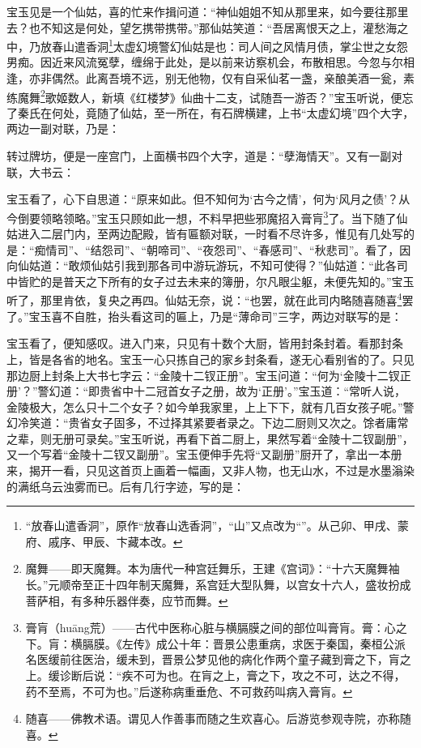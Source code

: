 \par 宝玉见是一个仙姑，喜的忙来作揖问道：“神仙姐姐不知从那里来，如今要往那里去？也不知这是何处，望乞携带携带。”那仙姑笑道：“吾居离恨天之上，灌愁海之中，乃放春山遣香洞\footnote{“放春山遣香洞”，原作“放春山选香洞”，“山”又点改为“\ShanYan”。从己卯、甲戌、蒙府、戚序、甲辰、卞藏本改。}太虚幻境警幻仙姑是也：司人间之风情月债，掌尘世之女怨男痴。因近来风流冤孽，缠绵于此处，是以前来访察机会，布散相思。今忽与尔相逢，亦非偶然。此离吾境不远，别无他物，仅有自采仙茗一盏，亲酿美酒一瓮，素练魔舞\footnote{魔舞——即天魔舞。本为唐代一种宫廷舞乐，王建《宫词》：“十六天魔舞袖长。”元顺帝至正十四年制天魔舞，系宫廷大型队舞，以宫女十六人，盛妆扮成菩萨相，有多种乐器伴奏，应节而舞。}歌姬数人，新填《红楼梦》仙曲十二支，试随吾一游否？”宝玉听说，便忘了秦氏在何处，竟随了仙姑，至一所在，有石牌横建，上书“太虚幻境”四个大字，两边一副对联，乃是：
\par 转过牌坊，便是一座宫门，上面横书四个大字，道是：“孽海情天”。又有一副对联，大书云：
\par 宝玉看了，心下自思道：“原来如此。但不知何为‘古今之情’，何为‘风月之债’？从今倒要领略领略。”宝玉只顾如此一想，不料早把些邪魔招入膏肓\footnote{膏肓（huāng荒）——古代中医称心脏与横膈膜之间的部位叫膏肓。膏：心之下。肓：横膈膜。《左传》成公十年：晋景公患重病，求医于秦国，秦桓公派名医缓前往医治，缓未到，晋景公梦见他的病化作两个童子藏到膏之下，肓之上。缓诊断后说：“疾不可为也。在肓之上，膏之下，攻之不可，达之不得，药不至焉，不可为也。”后遂称病重垂危、不可救药叫病入膏肓。}了。当下随了仙姑进入二层门内，至两边配殿，皆有匾额对联，一时看不尽许多，惟见有几处写的是：“痴情司”、“结怨司”、“朝啼司”、“夜怨司”、“春感司”、“秋悲司”。看了，因向仙姑道：“敢烦仙姑引我到那各司中游玩游玩，不知可使得？”仙姑道：“此各司中皆贮的是普天之下所有的女子过去未来的簿册，尔凡眼尘躯，未便先知的。”宝玉听了，那里肯依，复央之再四。仙姑无奈，说：“也罢，就在此司内略随喜随喜\footnote{随喜——佛教术语。谓见人作善事而随之生欢喜心。后游览参观寺院，亦称随喜。}罢了。”宝玉喜不自胜，抬头看这司的匾上，乃是“薄命司”三字，两边对联写的是：
\par 宝玉看了，便知感叹。进入门来，只见有十数个大厨，皆用封条封着。看那封条上，皆是各省的地名。宝玉一心只拣自己的家乡封条看，遂无心看别省的了。只见那边厨上封条上大书七字云：“金陵十二钗正册”。宝玉问道：“何为‘金陵十二钗正册’？”警幻道：“即贵省中十二冠首女子之册，故为‘正册’。”宝玉道：“常听人说，金陵极大，怎么只十二个女子？如今单我家里，上上下下，就有几百女孩子呢。”警幻冷笑道：“贵省女子固多，不过择其紧要者录之。下边二厨则又次之。馀者庸常之辈，则无册可录矣。”宝玉听说，再看下首二厨上，果然写着“金陵十二钗副册”，又一个写着“金陵十二钗又副册”。宝玉便伸手先将“又副册”厨开了，拿出一本册来，揭开一看，只见这首页上画着一幅画，又非人物，也无山水，不过是水墨滃染的满纸乌云浊雾而已。后有几行字迹，写的是：
